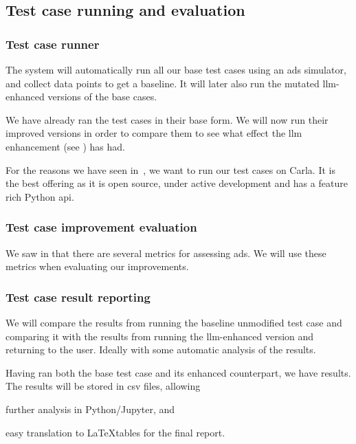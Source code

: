 \subsection{Test case running and evaluation}

\subsubsection{Test case runner}

The system will automatically run all
our base test cases using an \acrshort{ads} simulator, and collect data points to get a baseline. It
will later also run the mutated \acrshort{llm}-enhanced versions of the base cases.

We have already ran the test cases in their base form. We will now run their
improved versions in order to compare them to see what effect the \acrshort{llm}
enhancement (see ) has had.

For the reasons we have seen in~, we want to run our
test cases on Carla. It is the best offering as it is open source, under active
development and has a feature rich Python \acrshort{api}.

\subsubsection{Test case improvement evaluation}\label{sec:testCaseEval}

We saw in  that there are several metrics for assessing
\acrshort{ads}. We will use these metrics when evaluating our improvements.

\subsubsection{Test case result reporting}

We will compare the results from running
the baseline unmodified test case and comparing it with the results from
running the \acrshort{llm}-enhanced version and returning to the user. Ideally with
some automatic analysis of the results.

Having ran both the base test case and its enhanced counterpart, we have
results. The results will be stored in \acrfull{csv} files, allowing \begin{inparaenum}
    \item further analysis in Python/Jupyter,
    and
    \item easy translation to \LaTeX tables for the final report.
\end{inparaenum}

